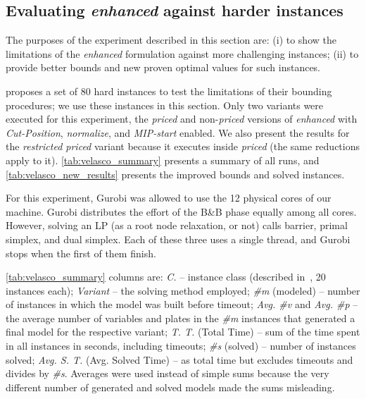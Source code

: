 \documentclass[smallextended]{svjour3}       %
\begin{document}
\subsection{Evaluating \emph{enhanced} against harder instances}
\label{sec:new_results}

The purposes of the experiment described in this section are:
(i) to show the limitations of the \emph{enhanced} formulation against more challenging instances;
(ii) to provide better bounds and new proven optimal values for such instances.

\cite{velasco:2019} proposes a set of 80 hard instances to test the limitations of their bounding procedures; we use these instances in this section.
Only two variants were executed for this experiment, the \emph{priced} and non-\emph{priced} versions of \emph{enhanced} with \emph{Cut-Position}, \emph{normalize}, and \emph{MIP-start} enabled.
We also present the results for the \emph{restricted priced} variant because it executes inside \emph{priced} (the same reductions apply to it).
\autoref{tab:velasco_summary} presents a summary of all runs, and \autoref{tab:velasco_new_results} presents the improved bounds and solved instances.

For this experiment, Gurobi was allowed to use the 12 physical cores of our machine.
Gurobi distributes the effort of the B\&B phase equally among all cores.
However, solving an LP (as a root node relaxation, or not) calls barrier, primal simplex, and dual simplex.
Each of these three uses a single thread, and Gurobi stops when the first of them finish.

\autoref{tab:velasco_summary} columns are:
\emph{C.} -- instance class (described in~\cite{velasco:2019}, 20 instances each);
\emph{Variant} -- the solving method employed;
\emph{\#m} (modeled) -- number of instances in which the model was built before timeout;
\emph{Avg. \#v} and \emph{Avg. \#p} -- the average number of variables and plates in the \emph{\#m} instances that generated a final model for the respective variant;
\emph{T. T.} (Total Time) -- sum of the time spent in all instances in seconds, including timeouts;
\emph{\#s} (solved) -- number of instances solved;
\emph{Avg. S. T.} (Avg. Solved Time) -- as total time but excludes timeouts and divides by \emph{\#s}.
Averages were used instead of simple sums because the very different number of generated and solved models made the sums misleading.
\end{document}
